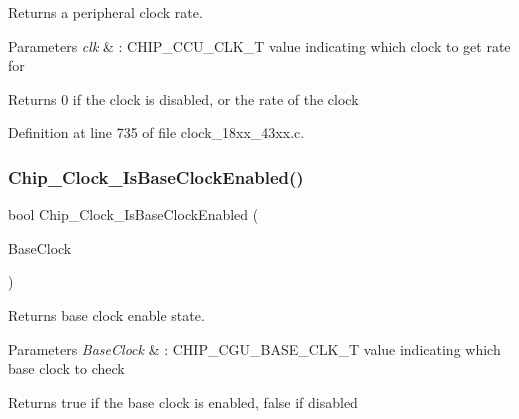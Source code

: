 Returns a peripheral clock rate. 


\begin{DoxyParams}{Parameters}
{\em clk} & \+: C\+H\+I\+P\+\_\+\+C\+C\+U\+\_\+\+C\+L\+K\+\_\+T value indicating which clock to get rate for \\
\hline
\end{DoxyParams}
\begin{DoxyReturn}{Returns}
0 if the clock is disabled, or the rate of the clock 
\end{DoxyReturn}


Definition at line 735 of file clock\+\_\+18xx\+\_\+43xx.\+c.

\mbox{\label{group___c_l_o_c_k__18_x_x__43_x_x_ga265d89b2296192ba7d5d2a63c4edd66e}} 
\subsubsection{\texorpdfstring{Chip\+\_\+\+Clock\+\_\+\+Is\+Base\+Clock\+Enabled()}{Chip\_Clock\_IsBaseClockEnabled()}}
{\footnotesize\ttfamily bool Chip\+\_\+\+Clock\+\_\+\+Is\+Base\+Clock\+Enabled (\begin{DoxyParamCaption}\item[{\hyperlink{chip__clocks_8h_a31e266dd83cc66eb866d8d051ffd1d45}{C\+H\+I\+P\+\_\+\+C\+G\+U\+\_\+\+B\+A\+S\+E\+\_\+\+C\+L\+K\+\_\+T}}]{Base\+Clock }\end{DoxyParamCaption})}



Returns base clock enable state. 


\begin{DoxyParams}{Parameters}
{\em Base\+Clock} & \+: C\+H\+I\+P\+\_\+\+C\+G\+U\+\_\+\+B\+A\+S\+E\+\_\+\+C\+L\+K\+\_\+T value indicating which base clock to check \\
\hline
\end{DoxyParams}
\begin{DoxyReturn}{Returns}
true if the base clock is enabled, false if disabled 
\end{DoxyReturn}


